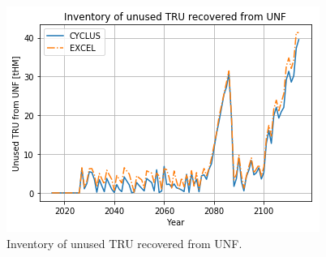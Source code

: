 \begin{figure}[htbp!]
	\begin{center}
		\includegraphics[scale=0.6]{./images/results_18/tru.png}
	\end{center}
        \caption{Inventory of unused \gls{TRU} recovered from \gls{UNF}.}
	\label{fig:tru}
\end{figure}

